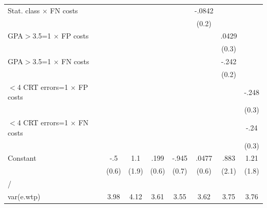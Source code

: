 {\begin{tabular}{l*{7}{c}}
Stat. class $\times$ FN costs&                  &                  &                  &                  &   -.0842         &                  &                  \\
                &                  &                  &                  &                  &    (0.2)         &                  &                  \\
GPA$>$3.5=1 $\times$ FP costs&                  &                  &                  &                  &                  &    .0429         &                  \\
                &                  &                  &                  &                  &                  &    (0.3)         &                  \\
GPA$>$3.5=1 $\times$ FN costs&                  &                  &                  &                  &                  &    -.242         &                  \\
                &                  &                  &                  &                  &                  &    (0.2)         &                  \\
$<$4 CRT errors=1 $\times$ FP costs&                  &                  &                  &                  &                  &                  &    -.248         \\
                &                  &                  &                  &                  &                  &                  &    (0.3)         \\
$<$4 CRT errors=1 $\times$ FN costs&                  &                  &                  &                  &                  &                  &     -.24         \\
                &                  &                  &                  &                  &                  &                  &    (0.3)         \\
Constant        &      -.5         &      1.1         &     .199         &    -.945         &    .0477         &     .883         &     1.21         \\
                &    (0.6)         &    (1.9)         &    (0.6)         &    (0.7)         &    (0.6)         &    (2.1)         &    (1.8)         \\
\hline
/               &                  &                  &                  &                  &                  &                  &                  \\
var(e.wtp)      &     3.98\sym{***}&     4.12\sym{***}&     3.61\sym{***}&     3.55\sym{***}&     3.62\sym{***}&     3.75\sym{***}&     3.76\sym{***}\\

\end{tabular}}
